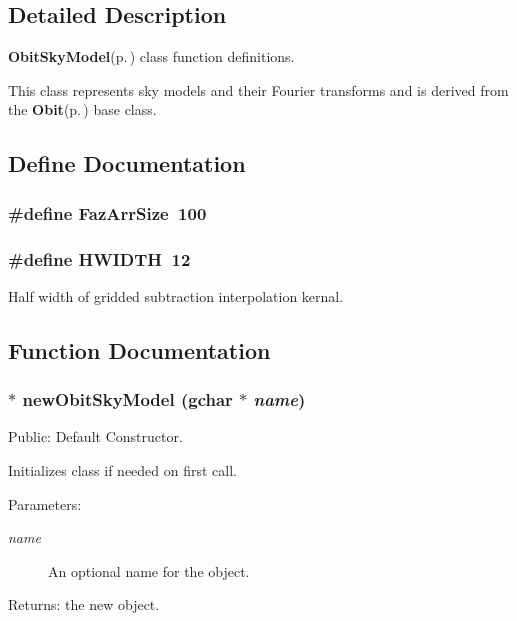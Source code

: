 \subsection{Detailed Description}
{\bf Obit\-Sky\-Model}{\rm (p.\,\pageref{structObitSkyModel})} class function definitions. 

This class represents sky models and their Fourier transforms and is derived from the {\bf Obit}{\rm (p.\,\pageref{structObit})} base class.

\subsection{Define Documentation}
\subsubsection{\setlength{\rightskip}{0pt plus 5cm}\#define Faz\-Arr\-Size\ 100}\label{ObitSkyModel_8c_a1}


\subsubsection{\setlength{\rightskip}{0pt plus 5cm}\#define HWIDTH\ 12}\label{ObitSkyModel_8c_a0}


Half width of gridded subtraction interpolation kernal. 



\subsection{Function Documentation}
\subsubsection{$\ast$ new\-Obit\-Sky\-Model (gchar $\ast$ {\em name})}\label{ObitSkyModel_8c_a13}


Public: Default Constructor. 

Initializes class if needed on first call. \begin{Desc}
\item[Parameters:]
\begin{description}
\item[{\em name}]An optional name for the object. \end{description}
\end{Desc}
\begin{Desc}
\item[Returns:]the new object. \end{Desc}
